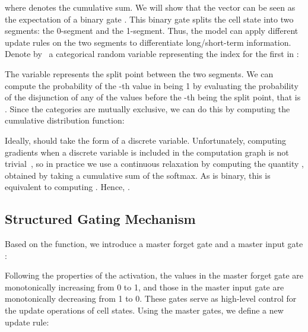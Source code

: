 \documentclass{article} \usepackage{iclr2019_conference,times}
\begin{document}
where  denotes the cumulative sum.
We will show that the vector  can be seen as the expectation of a binary gate . This binary gate splits the cell state into two segments: the 0-segment and the 1-segment. Thus, the model can apply different update rules on the two segments to differentiate long/short-term information. Denote by~ a categorical random variable representing the index for the first  in :

The variable  represents the split point between the two segments. We can compute the probability of the -th value in  being 1 by evaluating the probability of the disjunction of any of the values before the -th being the split point, that is . Since the categories are mutually exclusive, we can do this by computing the cumulative distribution function:

Ideally,  should take the form of a discrete variable.
Unfortunately, computing gradients when a discrete variable is included in the computation graph is not trivial~\citep{schulman2015gradient}, so in practice we use a continuous relaxation by computing the quantity , obtained by taking a cumulative sum of the softmax.
As  is binary, this is equivalent to computing . Hence, . 
\subsection{Structured Gating Mechanism}
Based on the  function, we introduce a master forget gate  and a master input gate :

Following the properties of the  activation, the values in the master forget gate are monotonically increasing from 0 to 1, and those in the master input gate are monotonically decreasing from 1 to 0.
These gates serve as high-level control for the update operations of cell states. Using the master gates, we define a new update rule:
\end{document}
